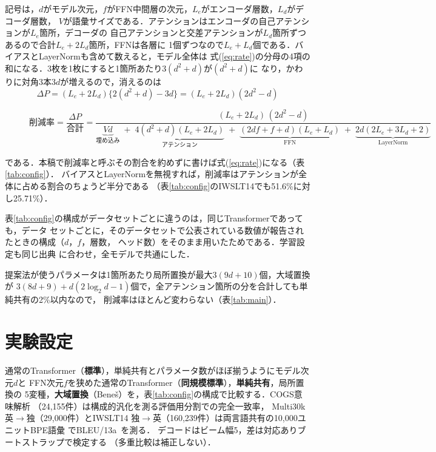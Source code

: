 \documentclass{nlp2026}
\begin{document}
記号は，$d$がモデル次元，$f$がFFN中間層の次元，$L_e$がエンコーダ層数，$L_d$がデコーダ層数，
$V$が語彙サイズである．アテンションはエンコーダの自己アテンションが$L_e$箇所，デコーダの
自己アテンションと交差アテンションが$L_d$箇所ずつあるので合計$L_e+2L_d$箇所，FFNは各層に
1個ずつなので$L_e+L_d$個である．バイアスとLayerNormも含めて数えると，モデル全体は
式(\ref{eq:rate})の分母の4項の和になる．3枚を1枚にすると1箇所あたり$3(d^2+d)$が$(d^2+d)$に
なり，かわりに対角3本$3d$が増えるので，消えるのは
\begin{equation}
 \Delta P=(L_e+2L_d)\bigl\{2(d^2+d)-3d\bigr\}=(L_e+2L_d)(2d^2-d)
 \label{eq:delta}
\end{equation}
\begin{figure}[t]
\begin{equation}
 \text{削減率}=\frac{\Delta P}{\text{合計}}
  =\frac{(L_e+2L_d)\,(2d^{2}-d)}
        {\underbrace{Vd}_{\text{埋め込み}}
         \;+\;\underbrace{4(d^{2}+d)(L_e+2L_d)}_{\text{アテンション}}
         \;+\;\underbrace{(2df+f+d)(L_e+L_d)}_{\text{FFN}}
         \;+\;\underbrace{2d(2L_e+3L_d+2)}_{\text{LayerNorm}}}
 \label{eq:rate}
\end{equation}
\end{figure}%
である．本稿で削減率と呼ぶその割合を約めずに書けば式(\ref{eq:rate})になる（表\ref{tab:config}）．
バイアスとLayerNormを無視すれば，削減率はアテンションが全体に占める割合のちょうど半分である
（表\ref{tab:config}のIWSLT14でも51.6\%に対し25.71\%）．

表\ref{tab:config}の構成がデータセットごとに違うのは，同じTransformerであっても，データ
セットごとに，そのデータセットで公表されている数値が報告されたときの構成（$d$，$f$，層数，
ヘッド数）をそのまま用いたためである．学習設定も同じ出典
\cite{csordas2021devil,wu2019payless,wu2021misconceived}に合わせ，全モデルで共通にした．

提案法が使うパラメータは1箇所あたり局所置換が最大$3(9d+10)$個，大域置換が
$3(8d+9)+d(2\log_2 d-1)$個で，全アテンション箇所の分を合計しても単純共有の2\%以内なので，
削減率はほとんど変わらない（表\ref{tab:main}）．

\section{実験設定}
\label{sec:experiments}

通常のTransformer（\textbf{標準}），単純共有とパラメータ数がほぼ揃うようにモデル次元$d$と
FFN次元$f$を狭めた通常のTransformer（\textbf{同規模標準}），\textbf{単純共有}，局所置換の
5変種，\textbf{大域置換}（Beneš）を，表\ref{tab:config}の構成で比較する．COGS意味解析
\cite{kim2020cogs}（24,155件）は構成的汎化を測る評価用分割での完全一致率，
Multi30k英$\rightarrow$独\cite{elliott2016multi30k}（29,000件）とIWSLT14
独$\rightarrow$英\cite{cettolo2014iwslt}（160,239件）は両言語共有の10,000ユニットBPE語彙
\cite{sennrich2016subword,kudo2018sentencepiece}でBLEU/13a~\cite{post2018sacrebleu}を測る．
デコードはビーム幅5，差は対応ありブートストラップ\cite{koehn2004statistical}で検定する
（多重比較は補正しない）．
\end{document}
